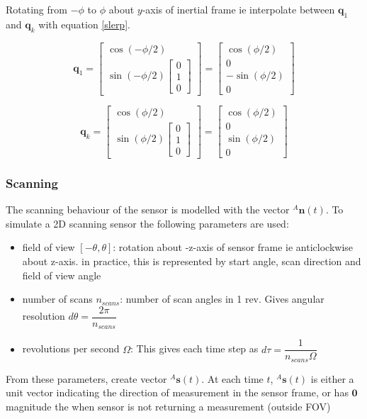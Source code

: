 													
Rotating from $-\phi$ to $\phi$ about $y$-axis of inertial frame ie interpolate between $\mathbf{q}_1$ and $\mathbf{q}_k$ with equation \ref{slerp}.
	
\begin{equation}
	\mathbf{q}_1 = \begin{bmatrix}
				 	\cos(-\phi/2) \\
				 	\sin(-\phi/2){\begin{bmatrix}
								 	0 \\ 1 \\ 0
							   	 \end{bmatrix}}
				 \end{bmatrix}
				 = \begin{bmatrix}
		 		   		\cos(\phi/2) \\ 0 \\ -\sin(\phi/2) \\ 0
				   \end{bmatrix}
\end{equation}

\begin{equation}
	\mathbf{q}_k = \begin{bmatrix}
				 	\cos(\phi/2) \\
				 	\sin(\phi/2){\begin{bmatrix}
								 	0 \\ 1 \\ 0
							   	 \end{bmatrix}}
				 \end{bmatrix}
				 = \begin{bmatrix}
		 		   		\cos(\phi/2) \\ 0 \\ \sin(\phi/2) \\ 0
				   \end{bmatrix}
\end{equation}

\subsubsection{Scanning}
The scanning behaviour of the sensor is modelled with the vector ${^{A}\mathbf{n}(t)}$.
To simulate a 2D scanning sensor the following parameters are used:
\begin{itemize}
\item field of view $[-\theta,\theta]$: rotation about -z-axis of sensor frame ie anticlockwise about z-axis. in practice, this is represented by start angle, scan direction and field of view angle
\item number of scans $n_{scans}$: number of scan angles in 1 rev. Gives angular resolution $d\theta = \dfrac{2\pi}{n_{scans}}$
\item revolutions per second $\Omega$: This gives each time step as $d\tau = \dfrac{1}{n_{scans}\Omega}$
\end{itemize}
From these parameters, create vector ${^{A}\mathbf{s}(t)}$. At each time $t$, ${^{A}\mathbf{s}(t)}$ is either a unit vector indicating the direction of measurement in the sensor frame, or has $\mathbf{0}$ magnitude the when sensor is not returning a measurement (outside FOV)

